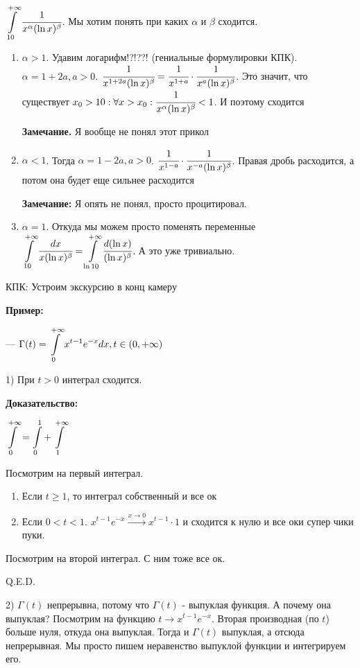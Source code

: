 $\displaystyle\int\limits_{10}^{+\infty}\cfrac{1}{x^{\alpha}(\ln x)^{\beta}}$. Мы хотим понять при каких $\alpha$ и $\beta$ сходится. 
\begin{enumerate}
    \item $\alpha >1$. Удавим логарифм!?!??! (гениальные формулировки КПК). $\alpha = 1 + 2a, a>0$. $\cfrac{1}{x^{1+2a}(\ln x)^\beta} = \cfrac{1}{x^{1+a}}\cdot \cfrac{1}{x^a (\ln x)^\beta}$. Это значит, что существует $x_0>10 : \forall x >x_0: \cfrac{1}{x^{\alpha}(\ln x)^{\beta}}<1$.  И поэтому сходится

    \textbf{Замечание.} Я вообще не понял этот прикол

    \item $\alpha <1$. Тогда $\alpha = 1-2a, a>0$. $\cfrac{1}{x^{1-a}} \cdot \cfrac{1}{x^{-a}(\ln x)^{\beta}}$. Правая дробь расходится, а потом она будет еще сильнее расходится
    
    \textbf{Замечание:} Я опять не понял, просто процитировал.

    \item $\alpha =1$. Откуда мы можем просто поменять переменные $\displaystyle\int\limits_{10}^{+\infty}  \cfrac{dx}{x (\ln x)^{\beta}} = \displaystyle\int\limits_{\ln 10}^{+\infty}\cfrac{d(\ln x)}{(\ln x)^\beta} $. А это уже тривиально.
\end{enumerate}

КПК: Устроим экскурсию в конц камеру

\textbf{Пример:}

 --- $\Gamma(t) = \displaystyle\int\limits_{0}^{+\infty}x^{t-1}e^{-x} dx, t \in (0,+\infty)$

1) При $t>0$ интеграл сходится. 

\textbf{Доказательство:}

$\displaystyle\int\limits_{0}^{+\infty} = \displaystyle\int\limits_{0}^{1} + \displaystyle\int\limits_{1}^{ + \infty}$


Посмотрим на первый интеграл.
\begin{enumerate}
    \item Если $t \geq 1$, то интеграл собственный и все ок
    \item Если $0<t<1$. $x^{t-1}e^{-x} \xrightarrow{x\rightarrow 0}  x^{t-1} \cdot 1$  и сходится к нулю и все оки супер чики пуки.
\end{enumerate}

Посмотрим на второй интеграл. С ним тоже все ок.

\hfill Q.E.D.

2) $\Gamma(t)$ непрерывна, потому что $\Gamma(t)$ - выпуклая функция. А почему она выпуклая? Посмотрим на функцию $t\rightarrow x^{t-1}e^{-x}$. Вторая производная (по $t$) больше нуля, откуда она выпуклая. Тогда и $\Gamma(t)$ выпуклая, а отсюда непрерывная. Мы просто пишем неравенство выпуклой функции и интегрируем его.

